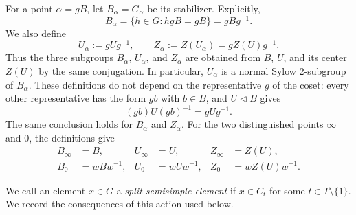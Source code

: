 \documentclass[11pt]{amsart}
\numberwithin{equation}{section}
\theoremstyle{definition}
\theoremstyle{remark}
\begin{document}
For a point $\alpha=gB$, let $B_\alpha=G_\alpha$ be its stabilizer. Explicitly,
\[
 B_\alpha=\{h\in G:hgB=gB\}=gBg^{-1}.
\]
We also define
\[
 U_\alpha:=gUg^{-1},\qquad
 Z_\alpha:=Z(U_\alpha)=gZ(U)g^{-1}.
\]
Thus the three subgroups $B_\alpha$, $U_\alpha$, and $Z_\alpha$ are obtained from $B$, $U$, and its center $Z(U)$ by the same conjugation. 
In particular, $U_\alpha$ is a normal Sylow $2$-subgroup of $B_\alpha$.
These definitions do not depend on the representative $g$ of the coset: every other representative has the form $gb$ with $b\in B$, and $U\lhd B$ gives
\[
 (gb)U(gb)^{-1}=gUg^{-1}.
\]
The same conclusion holds for $B_\alpha$ and $Z_\alpha$.
For the two distinguished points $\infty$ and $0$, the definitions give
\[
 \begin{aligned}
 B_\infty&=B,& U_\infty&=U,& Z_\infty&=Z(U),\\
 B_0&=wBw^{-1},& U_0&=wUw^{-1},& Z_0&=wZ(U)w^{-1}.
 \end{aligned}
\]

We call an element $x\in G$ a \emph{split semisimple element} if $x\in C_t$ for some $t\in T\setminus\{1\}$. We record the consequences of this action used below.
\end{document}
